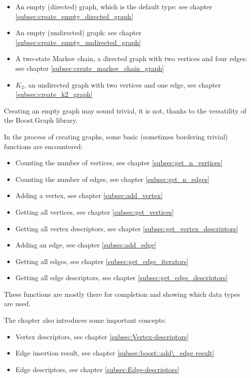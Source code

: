 \begin{itemize}
  \item An empty (directed) graph, which is the default type: 
    see chapter \ref{subsec:create_empty_directed_graph}
  \item An empty (undirected) graph: 
    see chapter \ref{subsec:create_empty_undirected_graph}
  \item A two-state Markov chain, a directed graph with two vertices 
    and four edges:
    see chapter \ref{subsec:create_markov_chain_graph}
  \item $K_{2}$, an undirected graph with two vertices and one edge, 
    see chapter \ref{subsec:create_k2_graph}
\end{itemize}


Creating an empty graph may sound trivial, it is not, thanks to the versatility
of the Boost.Graph library.

In the process of creating graphs, some basic (sometimes bordering trivial)
functions are encountered:

\begin{itemize}
  \item Counting the number of vertices, 
    see chapter \ref{subsec:get_n_vertices}
  \item Counting the number of edges,
     see chapter \ref{subsec:get_n_edges}
  \item Adding a vertex,
     see chapter \ref{subsec:add_vertex}
  \item Getting all vertices,
     see chapter \ref{subsec:get_vertices}
  \item Getting all vertex descriptors,
     see chapter \ref{subsec:get_vertex_descriptors}
  \item Adding an edge,
     see chapter \ref{subsec:add_edge}
  \item Getting all edges,
    see chapter \ref{subsec:get_edge_iterators}
  \item Getting all edge descriptors,
    see chapter \ref{subsec:get_edge_descriptors}
\end{itemize}

These functions are mostly there for completion and showing which data types
are used.

The chapter also introduces some important concepts:

\begin{itemize}
  \item Vertex descriptors,
    see chapter \ref{subsec:Vertex-descriptors}
  \item Edge insertion result,
    see chapter \ref{subsec:boost::add\_edge result}
  \item Edge descriptors,
    see chapter \ref{subsec:Edge-descriptors}
\end{itemize}

